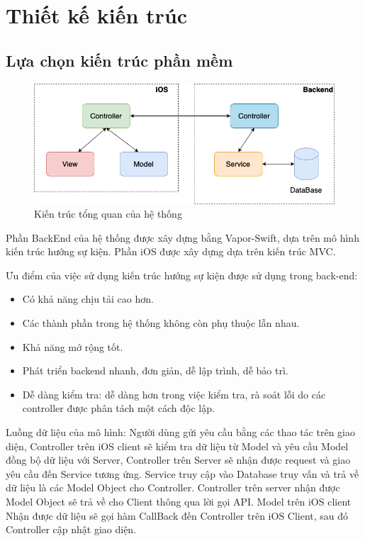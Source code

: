 \documentclass[../DoAn.tex]{subfiles}
\begin{document}
\section{Thiết kế kiến trúc}
\subsection{Lựa chọn kiến trúc phần mềm}
\begin{figure}[H]
    \centering
    \includegraphics[width=1\linewidth]{Hinhve/Architecture/System_Architecture.png}
    \caption{Kiến trúc tổng quan của hệ thống}
    \label{fig:use_case_tổng_quan}
\end{figure}

Phần BackEnd của hệ thống được xây dựng bằng Vapor-Swift, dựa trên mô hình kiến trúc hướng sự kiện. Phần iOS được xây dựng dựa trên kiến trúc MVC.

Ưu điểm của việc sử dụng kiến trúc hướng sự kiện được sử dụng trong back-end:
\begin{itemize}
    \item Có khả năng chịu tải cao hơn.
    \item Các thành phần trong hệ thống không còn phụ thuộc lẫn nhau.
    \item Khả năng mở rộng tốt.
    \item Phát triển backend nhanh, đơn giản, dễ lập trình, dễ bảo trì.
    \item Dễ dàng kiểm tra: dễ dàng hơn trong việc kiểm tra, rà soát lỗi do các controller được phân tách một cách độc lập.
\end{itemize}
Luồng dữ liệu của mô hình: Người dùng gửi yêu cầu bằng các thao tác trên giao diện, Controller trên iOS client sẽ kiểm tra dữ liệu từ Model và yêu cầu Model đồng bộ dữ liệu với Server, Controller trên Server sẽ nhận được request và giao yêu cầu đến Service tương ứng. Service truy cập vào Database truy vấn và trả về dữ liệu là các Model Object cho Controller. Controller trên server nhận được Model Object sẽ trả về cho Client thông qua lời gọi API. Model trên iOS client Nhận được dữ liệu sẽ gọi hàm CallBack đến Controller trên iOS Client, sau đó Controller cập nhật giao diện.
\newpage
\end{document}
